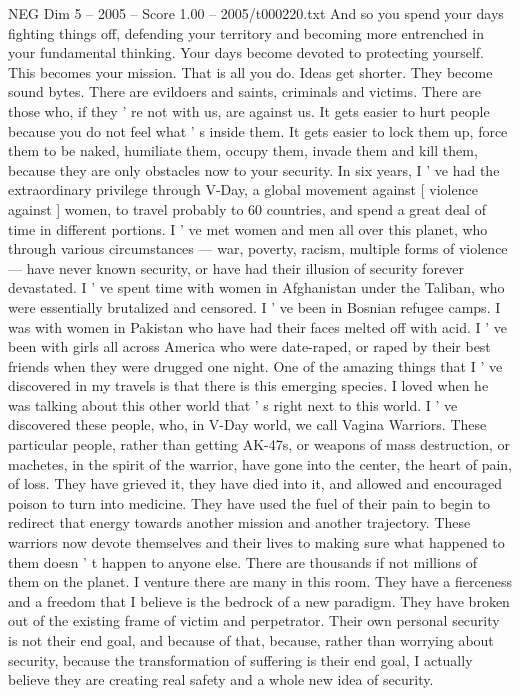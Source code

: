 \begin{textsample}{NEG Dim 5 – 2005 – Score 1.00 – 2005/t000220.txt}
And so you spend your days fighting things off, defending your territory and becoming more entrenched in your fundamental thinking.
Your days become devoted to protecting yourself.
This becomes your mission.
That is all you do.
Ideas get shorter.
They become sound bytes.
There are evildoers and saints, criminals and victims.
There are those who, if they ' re not with us, are against us.
It gets easier to hurt people because you do not feel what ' s inside them.
It gets easier to lock them up, force them to be naked, humiliate them, occupy them, invade them and kill them, because they are only obstacles now to your security.
In six years, I ' ve had the extraordinary privilege through V-Day, a global movement against [ violence against ] women, to travel probably to 60 countries, and spend a great deal of time in different portions.
I ' ve met women and men all over this planet, who through various circumstances — war, poverty, racism, multiple forms of violence — have never known security, or have had their illusion of security forever devastated.
I ' ve spent time with women in Afghanistan under the Taliban, who were essentially brutalized and censored.
I ' ve been in Bosnian refugee camps.
I was with women in Pakistan who have had their faces melted off with acid.
I ' ve been with girls all across America who were date-raped, or raped by their best friends when they were drugged one night.
One of the amazing things that I ' ve discovered in my travels is that there is this emerging species.
I loved when he was talking about this other world that ' s right next to this world.
I ' ve discovered these people, who, in V-Day world, we call Vagina Warriors.
These particular people, rather than getting AK-47s, or weapons of mass destruction, or machetes, in the spirit of the warrior, have gone into the center, the heart of pain, of loss.
They have grieved it, they have died into it, and allowed and encouraged poison to turn into medicine.
They have used the fuel of their pain to begin to redirect that energy towards another mission and another trajectory.
These warriors now devote themselves and their lives to making sure what happened to them doesn ' t happen to anyone else.
There are thousands if not millions of them on the planet.
I venture there are many in this room.
They have a fierceness and a freedom that I believe is the bedrock of a new paradigm.
They have broken out of the existing frame of victim and perpetrator.
Their own personal security is not their end goal, and because of that, because, rather than worrying about security, because the transformation of suffering is their end goal, I actually believe they are creating real safety and a whole new idea of security.

\end{textsample}
